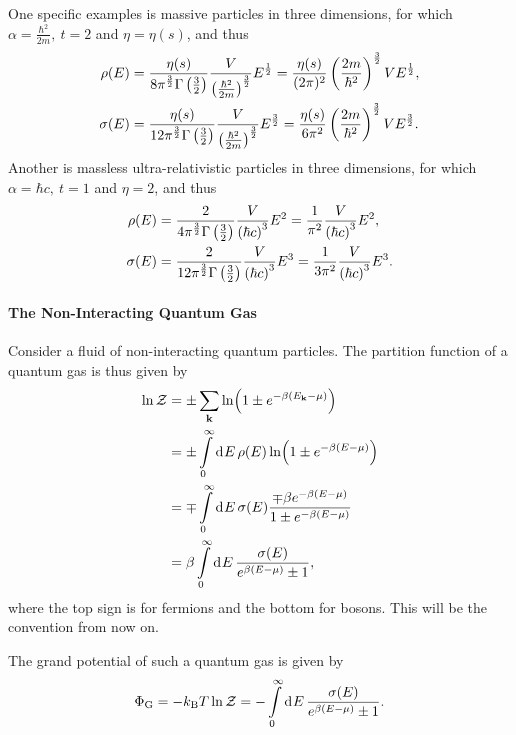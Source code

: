 One specific examples is massive particles in three dimensions, for which $\alpha = \frac{\hbar^{2}}{2m},\ t = 2$ and $\eta = \eta(s)$, and thus
\begin{align*}
	\rho(E)   &= \frac{\eta(s)}{8\pi^{\frac{3}{2}}\Gamma\left(\frac{3}{2}\right)}\frac{V}{\left(\frac{\hbar^{2}}{2m}\right)^{\frac{3}{2}}}E^{\frac{1}{2}} = \frac{\eta(s)}{(2\pi)^{2}}\left(\frac{2m}{\hbar^{2}}\right)^{\frac{3}{2}}VE^{\frac{1}{2}}, \\
	\sigma(E) &= \frac{\eta(s)}{12\pi^{\frac{3}{2}}\Gamma\left(\frac{3}{2}\right)}\frac{V}{\left(\frac{\hbar^{2}}{2m}\right)^{\frac{3}{2}}}E^{\frac{3}{2}} = \frac{\eta(s)}{6\pi^{2}}\left(\frac{2m}{\hbar^{2}}\right)^{\frac{3}{2}}VE^{\frac{3}{2}}.
\end{align*}
Another is massless ultra-relativistic particles in three dimensions, for which $\alpha = \hbar c,\ t = 1$ and $\eta = 2$, and thus
\begin{align*}
	\rho(E)   &= \frac{2}{4\pi^{\frac{3}{2}}\Gamma\left(\frac{3}{2}\right)}\frac{V}{\left(\hbar c\right)^{3}}E^{2} = \frac{1}{\pi^{2}}\frac{V}{\left(\hbar c\right)^{3}}E^{2}, \\
	\sigma(E) &= \frac{2}{12\pi^{\frac{3}{2}}\Gamma\left(\frac{3}{2}\right)}\frac{V}{\left(\hbar c\right)^{3}}E^{3} = \frac{1}{3\pi^{2}}\frac{V}{\left(\hbar c\right)^{3}}E^{3}.
\end{align*}

\paragraph{The Non-Interacting Quantum Gas}
Consider a fluid of non-interacting quantum particles. The partition function of a quantum gas is thus given by
\begin{align*}
	\ln{\mathcal{Z}} &= \pm\sum\limits_{\vb{k}}\ln(1 \pm e^{-\beta(E_{\vb{k}} - \mu)}) \\
	        &= \pm\int\limits_{0}^{\infty}\dd[]{E}\rho(E)\ln(1 \pm e^{-\beta(E - \mu)}) \\
	        &= \mp\int\limits_{0}^{\infty}\dd[]{E}\sigma(E)\frac{\mp\beta e^{-\beta(E - \mu)}}{1 \pm e^{-\beta(E - \mu)}} \\
	        &= \beta\int\limits_{0}^{\infty}\dd[]{E}\frac{\sigma(E)}{e^{\beta(E - \mu)} \pm 1},
\end{align*}
where the top sign is for fermions and the bottom for bosons. This will be the convention from now on.

The grand potential of such a quantum gas is given by
\begin{align*}
	\Phi_{\text{G}} = -k_{\text{B}} T\ln{\mathcal{Z}} = -\int\limits_{0}^{\infty}\dd[]{E}\frac{\sigma(E)}{e^{\beta(E - \mu)} \pm 1}.
\end{align*}

